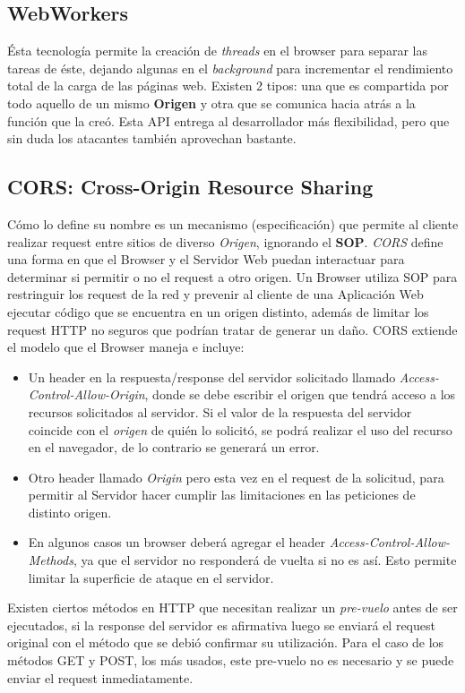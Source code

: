     \subsection{WebWorkers}
    \label{chap2:WWs}
    Ésta tecnología permite la creación de \textit{threads} en el browser para separar las tareas de éste, dejando algunas en el \textit{background} para incrementar el rendimiento total de la carga de las páginas web. Existen 2 tipos: una que es compartida por todo aquello de un mismo \textbf{Origen} y otra que se comunica hacia atrás a la función que la creó. Esta API entrega al desarrollador más flexibilidad, pero que sin duda los atacantes también aprovechan bastante.

    \subsection{CORS: Cross-Origin Resource Sharing}
    \label{chap2:CORS}
    Cómo lo define su nombre es un mecanismo (especificación) que permite al cliente realizar request entre sitios de diverso \textit{Origen}, ignorando el \textbf{SOP}. \textit{CORS} define una forma en que el Browser y el Servidor Web puedan interactuar para determinar si permitir o no el request a otro origen. Un Browser utiliza SOP para restringuir los request de la red y prevenir al cliente de una Aplicación Web ejecutar código que se encuentra en un origen distinto, además de limitar los request HTTP no seguros que podrían tratar de generar un daño. CORS extiende el modelo que el Browser maneja e incluye:
        
        \begin{itemize}
            \item Un header en la respuesta/response del servidor solicitado llamado \textit{Access-Control-Allow-Origin}, donde se debe escribir el origen que tendrá acceso a los recursos solicitados al servidor. Si el valor de la respuesta del servidor coincide con el \textit{origen} de quién lo solicitó, se podrá realizar el uso del recurso en el navegador, de lo contrario se generará un error.

            \item Otro header llamado \textit{Origin} pero esta vez en el request de la solicitud, para permitir al Servidor hacer cumplir las limitaciones en las peticiones de distinto origen.

            \item En algunos casos un browser deberá agregar el header \textit{Access-Control-Allow-Methods}, ya que el servidor no responderá de vuelta si no es así. Esto permite limitar la superficie de ataque en el servidor.

        \end{itemize}
        Existen ciertos métodos en HTTP que necesitan realizar un \textit{pre-vuelo} antes de ser ejecutados, si la response del servidor es afirmativa luego se enviará el request original con el método que se debió confirmar su utilización. Para el caso de los métodos GET y POST, los más usados, este pre-vuelo no es necesario y se puede enviar el request inmediatamente.
        
